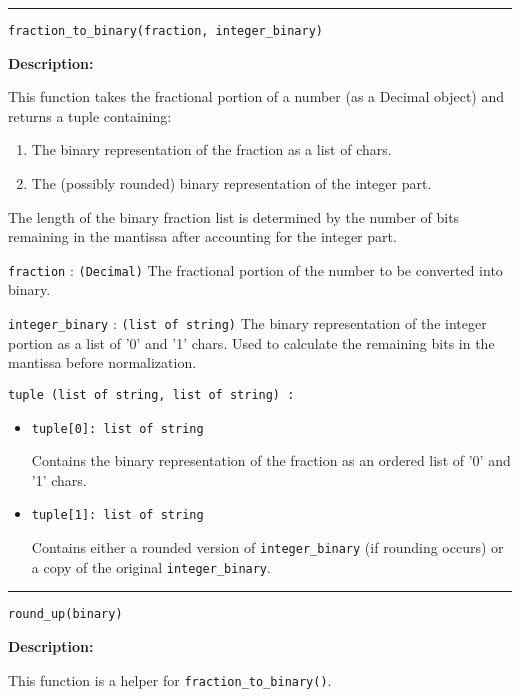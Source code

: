 \documentclass[12pt]{article}
\begin{document}
\hrule 

{\large\texttt{fraction\_to\_binary(fraction, integer\_binary)}}

\textbf{Description:}

This function takes the fractional portion of a number (as a Decimal object) and returns a tuple containing:
\begin{enumerate}
    \item The binary representation of the fraction as a list of chars.
    \item The (possibly rounded) binary representation of the integer part.
\end{enumerate}
The length of the binary fraction list is determined by the number of bits remaining in the mantissa after accounting for the integer part.

\begin{description}
    \item[Parameters:] 
    \item \texttt{fraction} : \texttt{(Decimal)} The fractional portion of the number to be converted into binary.
    \item \texttt{integer\_binary} : \texttt{(list of string)} The binary representation of the integer portion as a list of '0' and '1' chars. Used to calculate the remaining bits in the mantissa before normalization.

    \item[Returns:] 
    \item \texttt{tuple (list of string, list of string) :}
    \begin{itemize}
        \item \texttt{tuple[0]: list of string} 
        
        Contains the binary representation of the fraction as an ordered list of '0' and '1' chars.
        \item \texttt{tuple[1]: list of string} 
        
        Contains either a rounded version of \texttt{integer\_binary} (if rounding occurs) or a copy of the original \texttt{integer\_binary}. \\
    \end{itemize}
\end{description}

\hrule 

{\large\texttt{round\_up(binary)}}

\textbf{Description:}

This function is a helper for \texttt{fraction\_to\_binary()}.
\end{document}
